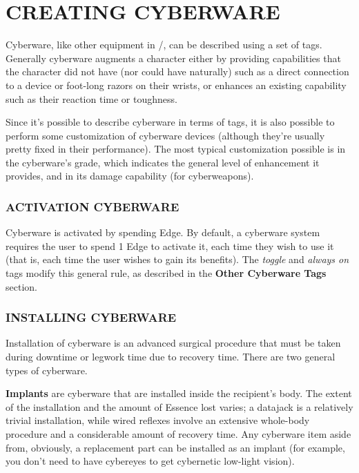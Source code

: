\documentclass[oneside,10pt]{article}
\begin{document}
\section{CREATING CYBERWARE}
\begin{multicols}{2}
Cyberware, like other equipment in \SW/, can be described using a set of tags. Generally cyberware augments
a character either by providing capabilities that the character did not have (nor could have naturally) such as a direct
connection to a device or foot-long razors on their wrists, or
enhances an existing capability such as their reaction time or
toughness.

Since it’s possible to describe cyberware in terms of tags,
it is also possible to perform some customization of cyberware devices (although they’re usually pretty fixed in their
performance). The most typical customization possible is in
the cyberware’s grade, which indicates the general level of
enhancement it provides, and in its damage capability (for
cyberweapons).

\subsubsection{ACTIVATION CYBERWARE}
Cyberware is activated by spending Edge. By default, a cyberware system requires the user to spend 1 Edge to activate
it, each time they wish to use it (that is, each time the user
wishes to gain its benefits). The \textit{toggle} and \textit{always on} tags
modify this general rule, as described in the \textbf{Other Cyberware Tags} section.

\subsubsection{INSTALLING CYBERWARE}
Installation of cyberware is an advanced surgical procedure
that must be taken during downtime or legwork time due
to recovery time. There are two general types of cyberware.

\textbf{Implants} are cyberware that are installed inside the recipient’s body. The extent of the installation and the amount of
Essence lost varies; a datajack is a relatively trivial installation,
while wired reflexes involve an extensive whole-body procedure and a considerable amount of recovery time. Any cyberware item aside from, obviously, a replacement part can be
installed as an implant (for example, you don’t need to have
cybereyes to get cybernetic low-light vision).


\end{multicols}
\end{document}
